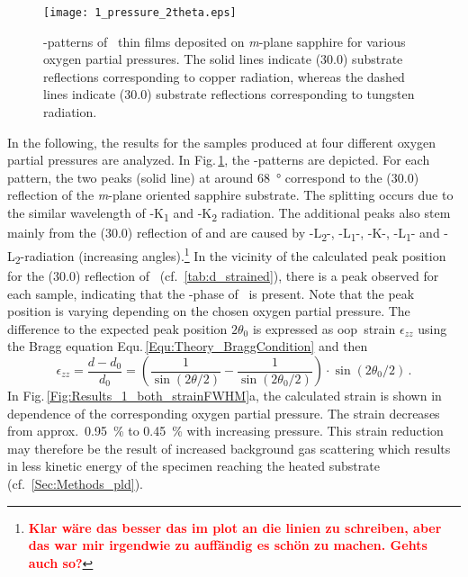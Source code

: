\begin{figure}
    \centering
    \texttt{[image: 1\_pressure\_2theta.eps]}
    \caption{\thetaomega-patterns of \cro\ thin films deposited on \textit{m}-plane sapphire for various oxygen partial pressures.
    The solid lines indicate (30.0) substrate reflections corresponding to copper radiation, whereas the dashed lines indicate (30.0) substrate reflections corresponding to tungsten radiation.}
    \label{Fig:Results_1_pressure_2theta}
\end{figure}
In the following, the results for the samples produced at four different oxygen partial pressures are analyzed.
In Fig.\,\ref{Fig:Results_1_pressure_2theta}, the \thetaomega-patterns are depicted.
For each pattern, the two peaks (solid line) at around \qty{68}{\degree} correspond to the (30.0) reflection of the \textit{m}-plane oriented sapphire substrate.
The splitting occurs due to the similar wavelength of -K\textalpha\textsubscript{1} and -K\textalpha\textsubscript{2} radiation.
The additional peaks also stem mainly from the (30.0) reflection of  and are caused by
-L\textbeta\textsubscript{2}-,
-L\textbeta\textsubscript{1}-,
-K\textbeta-,
-L\textalpha\textsubscript{1}- and
-L\textalpha\textsubscript{2}-radiation (increasing angles).\footnote{
    \bfseries\textcolor{red}{Klar wäre das besser das im plot an die linien zu schreiben, aber das war mir irgendwie zu auffändig es schön zu machen. Gehts auch so?}
}
In the vicinity of the calculated peak position for the (30.0) reflection of \cro\ (cf.~\ref{tab:d_strained}), there is a peak observed for each sample, indicating that the \textalpha-phase of \cro\ is present.
Note that the peak position is varying depending on the chosen oxygen partial pressure.
The difference to the expected peak position $2\theta_0$ is expressed as \gls{oop}\ strain $\epsilon_{zz}$ using the Bragg equation Equ.\,\ref{Equ:Theory_BraggCondition} and then
\begin{equation}
    \label{Equ:Results_oop_strain_def}
    \epsilon_{zz}
    =\frac{d-d_0}{d_0}
    =\left(\frac{1}{\sin(2\theta/2)}-\frac{1}{\sin(2\theta_0/2)}\right)
    \cdot\sin(2\theta_0/2)\,.
\end{equation}
In Fig.\,\ref{Fig:Results_1_both_strainFWHM}a, the calculated strain is shown in dependence of the corresponding oxygen partial pressure.
The strain decreases from approx.\ \qty{0.95}{\percent} to \qty{0.45}{\percent} with increasing pressure.
This strain reduction may therefore be the result of increased background gas scattering which results in less kinetic energy of the specimen reaching the heated substrate (cf.~\ref{Sec:Methods_pld}).
